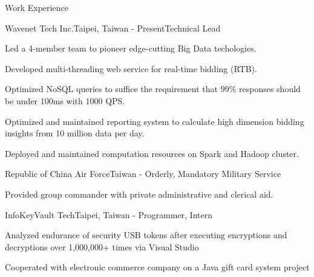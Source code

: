 \documentclass{cv}
\begin{document}
\begin{cvSection}{Work Experience}

\begin{experienceSubsection}{Wavenet Tech Inc.}{Taipei, Taiwan}{ - Present}{Technical Lead}

\item Led a 4-member team to pioneer edge-cutting Big Data techologies.
\item Developed multi-threading web service for real-time bidding (RTB).
\item Optimized NoSQL queries to suffice the requirement that $99\%$ responses should be under $100$ms with $1000$ QPS.
\item Optimized and maintained reporting system to calculate high dimension bidding insights from 10 million data per day.
\item Deployed and maintained computation resources on Spark and Hadoop cluster. 

\end{experienceSubsection}

\begin{experienceSubsection}{Republic of China Air Force}{Taiwan}{ - }{Orderly, Mandatory Military Service}

\item Provided group commander with private administrative and clerical aid.

\end{experienceSubsection}

\begin{experienceSubsection}{InfoKeyVault Tech}{Taipei, Taiwan}{ - }{Programmer, Intern}

\item Analyzed endurance of security USB tokens after executing encryptions and decryptions over 1,000,000+ times via Visual Studio
\item Cooperated with electronic commerce company on a Java gift card system project

\end{experienceSubsection}

\end{cvSection}
\end{document}
